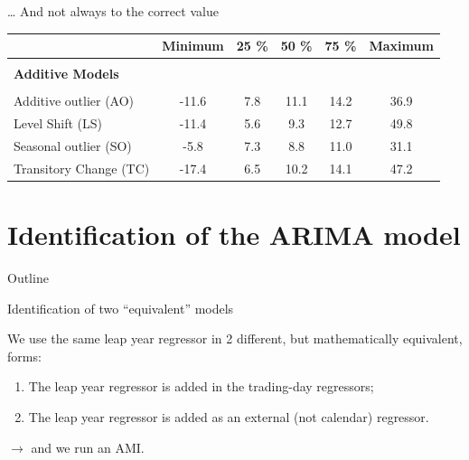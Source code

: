 \documentclass[10pt, handout]{beamer}
\begin{document}
\begin{frame}{\ldots{} And not always to the correct value}

\begin{table}
\begin{center}
\footnotesize
\begin{tabular}{lccccc}
\hline
\rule{0pt}{3ex}  & Minimum & 25 \% & 50 \% & 75 \% & Maximum\\
\hline
& & & & & \\
\bf{Additive Models} & & & & & \\
& & & & & \\
Additive outlier (AO) & -11.6 & 7.8 & 11.1 & 14.2 & 36.9\\
Level Shift (LS) & -11.4 & 5.6 & 9.3 & 12.7 & 49.8\\
Seasonal outlier (SO) & -5.8 & 7.3 & 8.8 & 11.0 & 31.1\\
Transitory Change (TC) & -17.4 & 6.5 & 10.2 & 14.1 & 47.2\\
\hline
\end{tabular}
\normalsize
\end{center}
\end{table}
\end{frame}

\section{Identification of the ARIMA model}
\begin{frame}{Outline}
\end{frame}

\begin{frame}{Identification of two ``equivalent'' models}

We use the same leap year regressor in 2 different, but mathematically equivalent, forms:
\begin{enumerate}
\def\labelenumi{\arabic{enumi}.}
\item   The leap year regressor is added in the trading-day regressors;
\item   The leap year regressor is added as an external (not calendar) regressor.
\end{enumerate}

\(\rightarrow\) and we run an AMI.

\end{frame}
\end{document}
